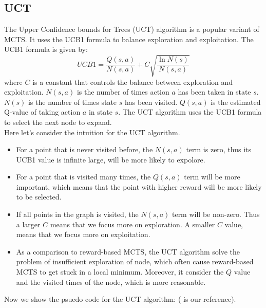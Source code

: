 \documentclass{article}
\begin{document}
\subsection{UCT}
The Upper Confidence bounds for Trees (UCT) algorithm \cite{UCT} is a popular variant of MCTS. It uses the UCB1 formula to balance exploration and exploitation. The UCB1 formula is given by:
\[
    UCB1 = \frac{Q(s,a)}{N(s,a)} + C \sqrt{\frac{\ln N(s)}{N(s,a)}}
\]
where \(C\) is a constant that controls the balance between exploration and exploitation. $N(s,a)$ is the number of times action $a$ has been taken in state $s$. $N(s)$ is the number of times state $s$ has been visited. \(Q(s,a)\) is the estimated Q-value of taking action \(a\) in state \(s\). The UCT algorithm uses the UCB1 formula to select the next node to expand.\\
Here let's consider the intuition for the UCT algorithm.\\
\begin{itemize}
    \item For a point that is never visited before, the $N(s,a)$ term is zero, thus its UCB1 value is infinite large, will be more likely to expolore.
    \item For a point that is visited many times, the $Q(s,a)$ term will be more important, which means that the point with higher reward will be more likely to be selected.
    \item If all points in the graph is visited, the $N(s,a)$ term will be non-zero. Thus a larger $C$ means that we focus more on exploration. A smaller $C$ value, means that we focus more on exploitation.
    \item As a comparison to reward-based MCTS, the UCT algorithm solve the problem of insufficient exploration of node, which often cause reward-based MCTS to get stuck in a local minimum. Moreover, it consider the $Q$ value and the visited times of the node, which is more reasonable.
\end{itemize}
Now we show the psuedo code for the UCT algorithm: (\cite{MCTSsurvey} is our reference).
\end{document}
